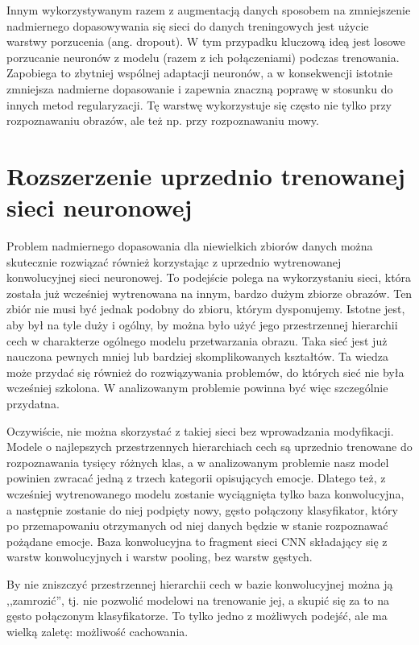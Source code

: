 Innym wykorzystywanym razem z augmentacją danych sposobem na zmniejszenie nadmiernego dopasowywania się sieci do danych treningowych jest użycie warstwy porzucenia (ang. dropout). W tym przypadku kluczową ideą jest losowe porzucanie neuronów z modelu (razem z ich połączeniami) podczas trenowania. Zapobiega to zbytniej wspólnej adaptacji neuronów, a w konsekwencji istotnie zmniejsza nadmierne dopasowanie i zapewnia znaczną poprawę w stosunku do innych metod regularyzacji. Tę warstwę wykorzystuje się często nie tylko przy rozpoznawaniu obrazów, ale też np. przy rozpoznawaniu mowy.


\section{Rozszerzenie uprzednio trenowanej sieci neuronowej}
Problem nadmiernego dopasowania dla niewielkich zbiorów danych można skutecznie rozwiązać również korzystając z uprzednio wytrenowanej konwolucyjnej sieci neuronowej. To podejście polega na wykorzystaniu sieci, która została już wcześniej wytrenowana na innym, bardzo dużym zbiorze obrazów. Ten zbiór nie musi być jednak podobny do zbioru, którym dysponujemy. Istotne jest, aby był na tyle duży i ogólny, by można było użyć jego przestrzennej hierarchii cech w charakterze ogólnego modelu przetwarzania obrazu. Taka sieć jest już nauczona pewnych mniej lub bardziej skomplikowanych kształtów. Ta wiedza może przydać się również do rozwiązywania problemów, do których sieć nie była wcześniej szkolona. W analizowanym problemie powinna być więc szczególnie przydatna.

Oczywiście, nie można skorzystać z takiej sieci bez wprowadzania modyfikacji. Modele o najlepszych przestrzennych hierarchiach cech są uprzednio trenowane do rozpoznawania tysięcy różnych klas, a w analizowanym problemie nasz model powinien zwracać jedną z trzech kategorii opisujących emocje. Dlatego też, z wcześniej wytrenowanego modelu zostanie wyciągnięta tylko baza konwolucyjna, a następnie zostanie do niej podpięty nowy, gęsto połączony klasyfikator, który po przemapowaniu otrzymanych od niej danych będzie w stanie rozpoznawać pożądane emocje. Baza konwolucyjna to fragment sieci CNN składający się z warstw konwolucyjnych i warstw pooling, bez warstw gęstych.

By nie zniszczyć przestrzennej hierarchii cech w bazie konwolucyjnej można ją ,,zamrozić'', tj. nie pozwolić modelowi na trenowanie jej, a skupić się za to na gęsto połączonym klasyfikatorze. To tylko jedno z możliwych podejść, ale ma wielką zaletę: możliwość cachowania.

